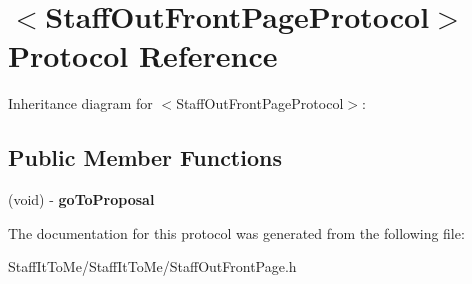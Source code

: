 \hypertarget{protocol_staff_out_front_page_protocol-p}{
\section{$<$\-Staff\-Out\-Front\-Page\-Protocol$>$ \-Protocol \-Reference}
\label{protocol_staff_out_front_page_protocol-p}
}


\-Inheritance diagram for $<$\-Staff\-Out\-Front\-Page\-Protocol$>$\-:
\subsection*{\-Public \-Member \-Functions}
\begin{DoxyCompactItemize}
\item 
\hypertarget{protocol_staff_out_front_page_protocol-p_aaef61316e9023c1f40061fd720687874}{
(void) -\/ {\bfseries go\-To\-Proposal}}
\label{protocol_staff_out_front_page_protocol-p_aaef61316e9023c1f40061fd720687874}

\end{DoxyCompactItemize}


\-The documentation for this protocol was generated from the following file\-:\begin{DoxyCompactItemize}
\item 
\-Staff\-It\-To\-Me/\-Staff\-It\-To\-Me/\-Staff\-Out\-Front\-Page.\-h\end{DoxyCompactItemize}
